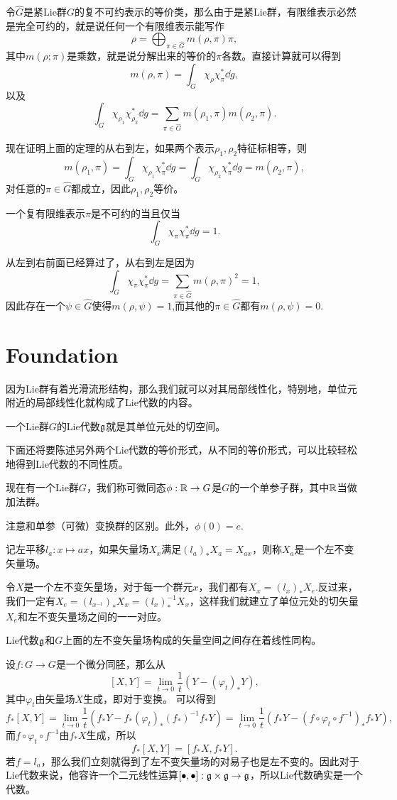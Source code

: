 令$\hat{G}$是紧Lie群$G$的复不可约表示的等价类，那么由于是紧Lie群，有限维表示必然是完全可约的，就是说任何一个有限维表示能写作
\[
	\rho=\bigoplus_{\pi\in\hat{G}}m(\rho,\pi)\pi,
\]
其中$m(\rho;\pi)$是乘数，就是说分解出来的等价的$\pi$各数。直接计算就可以得到
\[
	m(\rho,\pi)=\int_G \chi_\rho \chi_\pi^*\dd g,
\]
以及
\[
	\int_G \chi_{\rho_1} \chi_{\rho_2}^*\dd g=\sum_{\pi\in\hat{G}}m(\rho_1,\pi)m(\rho_2,\pi).
\]

现在证明上面的定理的从右到左，如果两个表示$\rho_1,\rho_2$特征标相等，则
\[
	m(\rho_1,\pi)=\int_G \chi_{\rho_1} \chi_\pi^*\dd g=\int_G \chi_{\rho_2} \chi_\pi^*\dd g=m(\rho_2,\pi),
\]
对任意的$\pi\in\hat{G}$都成立，因此$\rho_1,\rho_2$等价。

\pro 一个复有限维表示$\pi$是不可约的当且仅当
\[
	\int_G \chi_{\pi} \chi_{\pi}^*\dd g=1.
\]

从左到右前面已经算过了，从右到左是因为
\[
	\int_G \chi_{\pi} \chi_{\pi}^*\dd g=\sum_{\pi\in\hat{G}}m(\rho,\pi)^2=1,
\]
因此存在一个$\psi\in\hat{G}$使得$m(\rho,\psi)=1$,而其他的$\pi\in\hat{G}$都有$m(\rho,\psi)=0$.

\section{Foundation}
因为Lie群有着光滑流形结构，那么我们就可以对其局部线性化，特别地，单位元附近的局部线性化就构成了Lie代数的内容。

\para 一个Lie群$G$的Lie代数${\mathfrak{g}}$就是其单位元处的切空间。

下面还将要陈述另外两个Lie代数的等价形式，从不同的等价形式，可以比较轻松地得到Lie代数的不同性质。

\para 现在有一个Lie群$G$，我们称可微同态$\phi:\mathbb{R}\to G$是$G$的一个单参子群，其中$\mathbb{R}$当做加法群。

注意和单参（可微）变换群的区别。此外，$\phi(0)=e$.

\para 记左平移$l_a:x\mapsto ax$，如果矢量场$X_x$满足$(l_a)_*X_a=X_{ax}$，则称$X_a$是一个左不变矢量场。

令$X$是一个左不变矢量场，对于每一个群元$x$，我们都有$X_x=(l_x)_*X_e$.反过来，我们一定有$X_e=(l_{x^{-1}})_*X_x=(l_x)^{-1}_*X_x$，这样我们就建立了单位元处的切矢量$X_e$和左不变矢量场之间的一一对应。

\pro Lie代数${\mathfrak{g}}$和$G$上面的左不变矢量场构成的矢量空间之间存在着线性同构。

设$f:G\to G$是一个微分同胚，那么从
\[
	[X,Y]=\lim_{t\to 0}\frac{1}{t}\left(Y-(\varphi_t)_*Y\right),
\]
其中$\varphi_t$由矢量场$X$生成，即对于变换。
可以得到
\[
	f_*[X,Y]=\lim_{t\to 0}\frac{1}{t}\left(f_*Y-f_*(\varphi_t)_*(f_*)^{-1}f_*Y\right)=\lim_{t\to 0}\frac{1}{t}\left(f_*Y-(f\circ\varphi_t\circ f^{-1})_*f_*Y\right),
\]
而$f\circ\varphi_t\circ f^{-1}$由$f_*X$生成，所以
\[
	f_*[X,Y]=[f_*X,f_*Y].
\]
若$f=l_a$，那么我们立刻就得到了左不变矢量场的对易子也是左不变的。因此对于Lie代数来说，他容许一个二元线性运算$[\bullet,\bullet]:{\mathfrak{g}}\times {\mathfrak{g}}\to {\mathfrak{g}}$，所以Lie代数确实是一个代数。

